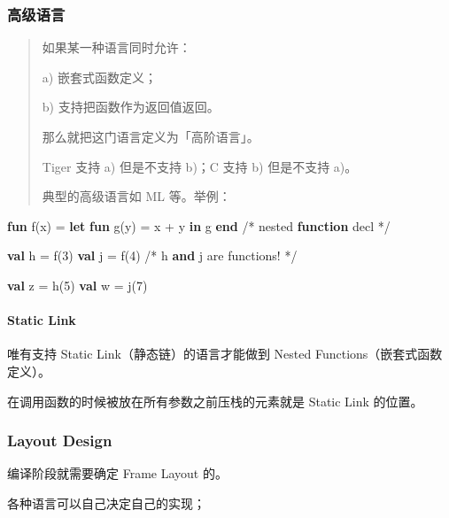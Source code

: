 \documentclass[
]{article}
\newenvironment{Shaded}{}{}
\newcommand{\DecValTok}[1]{\textcolor[rgb]{0.25,0.63,0.44}{#1}}
\newcommand{\KeywordTok}[1]{\textcolor[rgb]{0.00,0.44,0.13}{\textbf{#1}}}
\newcommand{\NormalTok}[1]{#1}
\begin{document}
\hypertarget{header-n201}{%
\subsubsection{高级语言}\label{header-n201}}

\begin{quote}
如果某一种语言同时允许：

a) 嵌套式函数定义；

b) 支持把函数作为返回值返回。

那么就把这门语言定义为「高阶语言」。

Tiger 支持 a) 但是不支持 b)；C 支持 b) 但是不支持 a)。

典型的高级语言如 ML 等。举例：
\end{quote}

\begin{Shaded}
\begin{Highlighting}[]
\KeywordTok{fun}\NormalTok{ f(x) =}
	\KeywordTok{let} \KeywordTok{fun}\NormalTok{ g(y) = x + y}
	\KeywordTok{in}\NormalTok{ g}
\KeywordTok{end}
\NormalTok{/* nested }\KeywordTok{function}\NormalTok{ decl */}

\KeywordTok{val}\NormalTok{ h = f(}\DecValTok{3}\NormalTok{)}
\KeywordTok{val}\NormalTok{ j = f(}\DecValTok{4}\NormalTok{)}
\NormalTok{/* h }\KeywordTok{and}\NormalTok{ j are functions! */}

\KeywordTok{val}\NormalTok{ z = h(}\DecValTok{5}\NormalTok{)}
\KeywordTok{val}\NormalTok{ w = j(}\DecValTok{7}\NormalTok{)}
\end{Highlighting}
\end{Shaded}

\hypertarget{header-n210}{%
\paragraph{Static Link}\label{header-n210}}

唯有支持 Static Link（静态链）的语言才能做到 Nested
Functions（嵌套式函数定义）。

在调用函数的时候被放在所有参数之前压栈的元素就是 Static Link 的位置。

\hypertarget{header-n213}{%
\subsubsection{Layout Design}\label{header-n213}}

编译阶段就需要确定 Frame Layout 的。

各种语言可以自己决定自己的实现；
\end{document}
